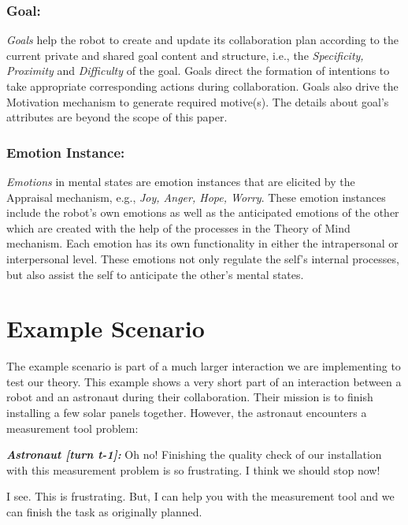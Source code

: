 \documentclass{aamas2016}
\begin{document}
\subsubsection{Goal:}

\textit{Goals} help the robot to create and update its collaboration plan
according to the current private and shared goal content and structure, i.e.,
the \textit{Specificity, Proximity} and \textit{Difficulty} of the goal. Goals
direct the formation of intentions to take appropriate corresponding actions
during collaboration. Goals also drive the Motivation mechanism to generate
required motive(s). The details about goal's attributes are beyond the scope of
this paper.

\subsubsection{Emotion Instance:}

\textit{Emotions} in mental states are emotion instances that are elicited by
the Appraisal mechanism, e.g., \textit{Joy, Anger, Hope, Worry}. These emotion
instances include the robot's own emotions as well as the anticipated emotions
of the other which are created with the help of the processes in the Theory of
Mind mechanism. Each emotion has its own functionality in either the
intrapersonal or interpersonal level. These emotions not only regulate the
self's internal processes, but also assist the self to anticipate the other's
mental states.

\section{Example Scenario}

The example scenario is part of a much larger interaction we are implementing to
test our theory. This example shows a very short part of an interaction between
a robot and an astronaut during their collaboration. Their mission is to finish
installing a few solar panels together. However, the astronaut encounters a
measurement tool problem:

\begin{description}
  \item \textit{\textbf{\fontsize{9pt}{12pt}\selectfont Astronaut [turn t-1]:}}
  Oh no! Finishing the quality check of our installation with this measurement
  problem is so frustrating. I think we should stop now!

  \item \textit{\textbf{\fontsize{9pt}{12pt}\selectfont{Robot [turn t]:}}}
  I see. This is frustrating. But, I can help you with the measurement tool and
  we can finish the task as originally planned.
\end{description}
\end{document}
